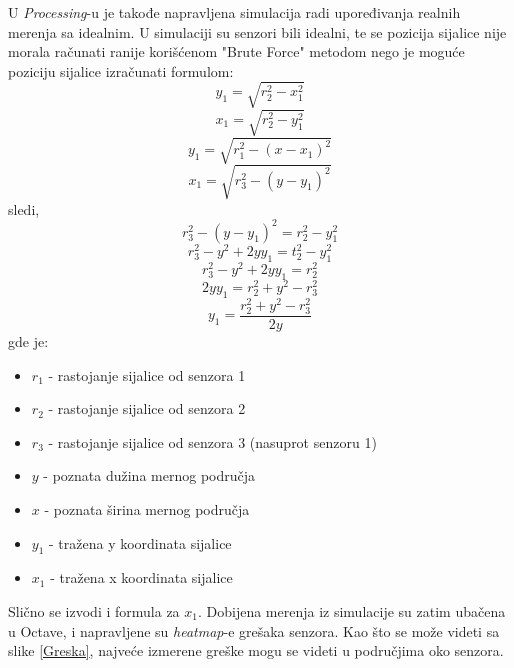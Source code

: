 \documentclass{article}
\begin{document}
    U \textit{Processing}-u je takođe napravljena simulacija radi upoređivanja realnih merenja sa idealnim. U simulaciji su senzori bili idealni, te se pozicija sijalice nije morala računati ranije korišćenom "Brute Force" metodom nego je moguće poziciju sijalice izračunati formulom:
    $$y_1 = \sqrt{r_2^{2}-x_1^{2}}$$
    $$x_1 = \sqrt{r_2^{2}-y_1^{2}}$$
    $$y_1 = \sqrt{r_1^{2}-(x-x_1)^{2}}$$
    $$x_1 = \sqrt{r_3^{2}-(y-y_1)^{2}}$$
    \newline
    sledi, 
    $$r_3^{2}-(y-y_1)^{2} = r_2^{2}-y_1^{2}$$
    $$r_3^{2}-y^{2}+2yy_1 = t_2^{2}-y_1^{2}$$
    $$r_3^{2}-y^{2}+2yy_1 = r_2^{2}$$
    $$2yy_1 = r_2^{2}+y^{2}-r_3^{2}$$
    $$y_1 = \frac{r_2^{2}+y^{2}-r_3^{2}}{2y}$$
    gde je:
    \begin{itemize}
        \item $r_1$ - rastojanje sijalice od senzora 1
        \item $r_2$ - rastojanje sijalice od senzora 2
        \item $r_3$ - rastojanje sijalice od senzora 3 (nasuprot senzoru 1)
        \item $y$ - poznata dužina mernog područja
        \item $x$ - poznata širina mernog područja
        \item $y_1$ - tražena y koordinata sijalice
        \item $x_1$ - tražena x koordinata sijalice
    \end{itemize}
    Slično se izvodi i formula za $x_1$. Dobijena merenja iz simulacije su zatim ubačena u Octave, i napravljene su \textit{heatmap}-e grešaka senzora. Kao što se može videti sa slike \ref{Greska}, najveće izmerene greške mogu se videti u područjima oko senzora.
\end{document}
